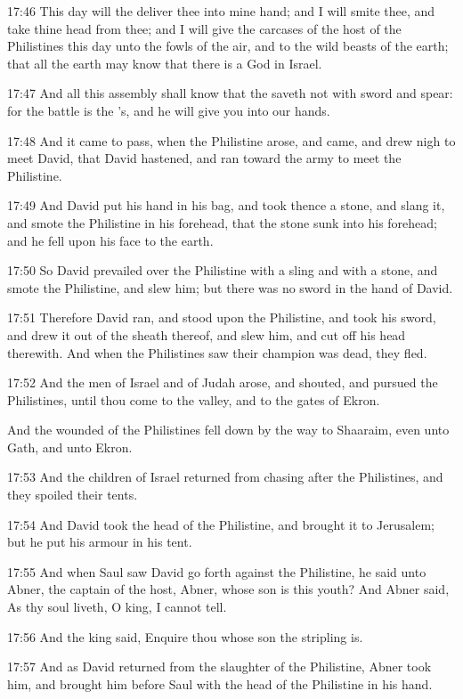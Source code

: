 17:46 This day will the \LORD deliver thee into mine hand; and I will smite thee, and take thine head from thee; and I will give the carcases of the host of the Philistines this day unto the fowls of the air, and to the wild beasts of the earth; that all the earth may know that there is a God in Israel.

17:47 And all this assembly shall know that the \LORD saveth not with sword and spear: for the battle is the \LORD's, and he will give you into our hands.

17:48 And it came to pass, when the Philistine arose, and came, and drew nigh to meet David, that David hastened, and ran toward the army to meet the Philistine.

17:49 And David put his hand in his bag, and took thence a stone, and slang it, and smote the Philistine in his forehead, that the stone sunk into his forehead; and he fell upon his face to the earth.

17:50 So David prevailed over the Philistine with a sling and with a stone, and smote the Philistine, and slew him; but there was no sword in the hand of David.

17:51 Therefore David ran, and stood upon the Philistine, and took his sword, and drew it out of the sheath thereof, and slew him, and cut off his head therewith. And when the Philistines saw their champion was dead, they fled.

17:52 And the men of Israel and of Judah arose, and shouted, and pursued the Philistines, until thou come to the valley, and to the gates of Ekron.

And the wounded of the Philistines fell down by the way to Shaaraim, even unto Gath, and unto Ekron.

17:53 And the children of Israel returned from chasing after the Philistines, and they spoiled their tents.

17:54 And David took the head of the Philistine, and brought it to Jerusalem; but he put his armour in his tent.

17:55 And when Saul saw David go forth against the Philistine, he said unto Abner, the captain of the host, Abner, whose son is this youth?  And Abner said, As thy soul liveth, O king, I cannot tell.

17:56 And the king said, Enquire thou whose son the stripling is.

17:57 And as David returned from the slaughter of the Philistine, Abner took him, and brought him before Saul with the head of the Philistine in his hand.

